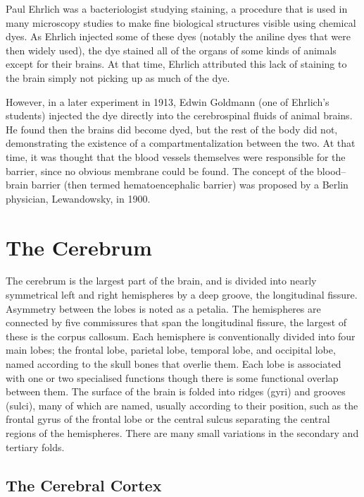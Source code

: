 Paul Ehrlich was a bacteriologist studying staining, a procedure that is used in many microscopy studies to make fine biological structures visible using chemical dyes. As Ehrlich injected some of these dyes (notably the aniline dyes that were then widely used), the dye stained all of the organs of some kinds of animals except for their brains. At that time, Ehrlich attributed this lack of staining to the brain simply not picking up as much of the dye.

However, in a later experiment in 1913, Edwin Goldmann (one of Ehrlich's students) injected the dye directly into the cerebrospinal fluids of animal brains. He found then the brains did become dyed, but the rest of the body did not, demonstrating the existence of a compartmentalization between the two. At that time, it was thought that the blood vessels themselves were responsible for the barrier, since no obvious membrane could be found. The concept of the blood--brain barrier (then termed hematoencephalic barrier) was proposed by a Berlin physician, Lewandowsky, in 1900.

\hypertarget{the-cerebrum}{%
\section{The Cerebrum}\label{the-cerebrum}}

The cerebrum is the largest part of the brain, and is divided into nearly symmetrical left and right hemispheres by a deep groove, the longitudinal fissure. Asymmetry between the lobes is noted as a petalia. The hemispheres are connected by five commissures that span the longitudinal fissure, the largest of these is the corpus callosum. Each hemisphere is conventionally divided into four main lobes; the frontal lobe, parietal lobe, temporal lobe, and occipital lobe, named according to the skull bones that overlie them. Each lobe is associated with one or two specialised functions though there is some functional overlap between them. The surface of the brain is folded into ridges (gyri) and grooves (sulci), many of which are named, usually according to their position, such as the frontal gyrus of the frontal lobe or the central sulcus separating the central regions of the hemispheres. There are many small variations in the secondary and tertiary folds.

\hypertarget{the-cerebral-cortex}{%
\subsection{The Cerebral Cortex}\label{the-cerebral-cortex}}

